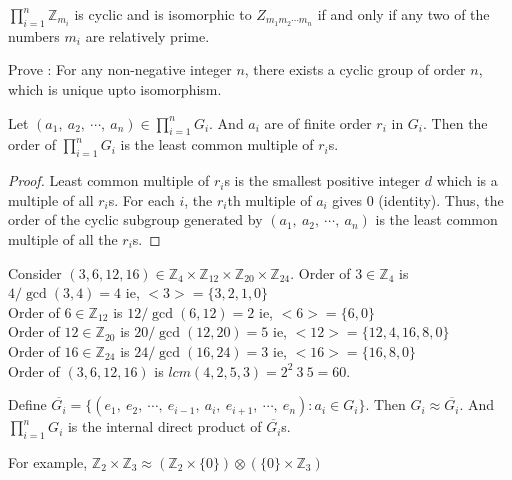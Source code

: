 \begin{corollary}
	$\prod\limits_{i = 1}^n \mathbb{Z}_{m_i}$ is cyclic and is isomorphic to $Z_{m_1m_2\cdots m_n}$ if and only if any two of the numbers $m_i$ are relatively prime.
\end{corollary}

\begin{question}
	Prove : For any non-negative integer $n$, there exists a cyclic group of order $n$, which is unique upto isomorphism.
\end{question}

\begin{theorem}
	Let $(a_1,\ a_2,\ \cdots,\ a_n) \in \prod\limits_{i = 1}^n G_i$. And $a_i$ are of finite order $r_i$ in $G_i$. Then the order of $\prod\limits_{i = 1}^n G_i$ is the least common multiple of $r_i$s.
\end{theorem}
\begin{proof}
	Least common multiple of $r_i$s is the smallest positive integer $d$ which is a multiple of all $r_i$s.
	For each $i$, the $r_i$th multiple of $a_i$ gives $0$ (identity).
	Thus, the order of the cyclic subgroup generated by $(a_1,\ a_2,\ \cdots,\ a_n)$ is the least common multiple of all the $r_i$s.
\end{proof}
\begin{remark}
	Consider $(3,6,12,16) \in \mathbb{Z}_4 \times \mathbb{Z}_{12} \times \mathbb{Z}_{20} \times \mathbb{Z}_{24}$.
	Order of $3 \in \mathbb{Z}_4$ is ${4}/{\gcd(3,4)} = 4$ ie, $<3> = \{ 3,2,1,0 \}$\\
	Order of $6 \in \mathbb{Z}_{12}$ is ${12}/{\gcd(6,12)} = 2$ ie, $<6> = \{ 6,0 \}$\\
	Order of $12 \in \mathbb{Z}_{20}$ is ${20}/{\gcd(12,20)} = 5$ ie, $<12> = \{ 12,4,16,8,0 \}$\\
	Order of $16 \in \mathbb{Z}_{24}$ is ${24}/{\gcd(16,24)} = 3$ ie, $<16> = \{ 16,8,0 \}$\\
	Order of $(3,6,12,16)$ is $lcm(4,2,5,3) = 2^2\ 3\ 5 = 60$.
\end{remark}

\begin{remark}
	Define $\overline{G_i} = \{ (e_1,\ e_2,\ \cdots,\ e_{i-1},\ a_i,\ e_{i+1},\ \cdots,\ e_n) : a_i \in G_i\}$.
	Then $G_i \approx \overline{G_i}$.
	And $\prod\limits_{i=1}^n G_i$ is the internal direct product of $\overline{G_i}$s.

	For example, $\mathbb{Z}_2 \times \mathbb{Z}_3 \approx \left( \mathbb{Z}_2 \times \{ 0 \} \right) \otimes \left( \{ 0 \} \times \mathbb{Z}_3 \right)$
\end{remark}


